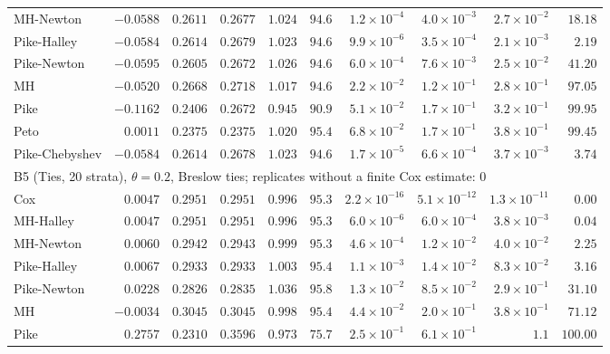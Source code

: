\begin{landscape}
\begin{longtable}{lrrrrrrrrr}
MH-Newton & $-0.0588$ & $0.2611$ & $0.2677$ & $1.024$ & $94.6$ & $1.2 \times 10^{-4}$ & $4.0 \times 10^{-3}$ & $2.7 \times 10^{-2}$ & $18.18$ \\
Pike-Halley & $-0.0584$ & $0.2614$ & $0.2679$ & $1.023$ & $94.6$ & $9.9 \times 10^{-6}$ & $3.5 \times 10^{-4}$ & $2.1 \times 10^{-3}$ & $2.19$ \\
Pike-Newton & $-0.0595$ & $0.2605$ & $0.2672$ & $1.026$ & $94.6$ & $6.0 \times 10^{-4}$ & $7.6 \times 10^{-3}$ & $2.5 \times 10^{-2}$ & $41.20$ \\
MH & $-0.0520$ & $0.2668$ & $0.2718$ & $1.017$ & $94.6$ & $2.2 \times 10^{-2}$ & $1.2 \times 10^{-1}$ & $2.8 \times 10^{-1}$ & $97.05$ \\
Pike & $-0.1162$ & $0.2406$ & $0.2672$ & $0.945$ & $90.9$ & $5.1 \times 10^{-2}$ & $1.7 \times 10^{-1}$ & $3.2 \times 10^{-1}$ & $99.95$ \\
Peto & $0.0011$ & $0.2375$ & $0.2375$ & $1.020$ & $95.4$ & $6.8 \times 10^{-2}$ & $1.7 \times 10^{-1}$ & $3.8 \times 10^{-1}$ & $99.45$ \\
Pike-Chebyshev & $-0.0584$ & $0.2614$ & $0.2678$ & $1.023$ & $94.6$ & $1.7 \times 10^{-5}$ & $6.6 \times 10^{-4}$ & $3.7 \times 10^{-3}$ & $3.74$ \\
\multicolumn{10}{l}{B5 (Ties, 20 strata), $\theta = 0.2$, Breslow ties; replicates without a finite Cox estimate: 0} \\
Cox & $0.0047$ & $0.2951$ & $0.2951$ & $0.996$ & $95.3$ & $2.2 \times 10^{-16}$ & $5.1 \times 10^{-12}$ & $1.3 \times 10^{-11}$ & $0.00$ \\
MH-Halley & $0.0047$ & $0.2951$ & $0.2951$ & $0.996$ & $95.3$ & $6.0 \times 10^{-6}$ & $6.0 \times 10^{-4}$ & $3.8 \times 10^{-3}$ & $0.04$ \\
MH-Newton & $0.0060$ & $0.2942$ & $0.2943$ & $0.999$ & $95.3$ & $4.6 \times 10^{-4}$ & $1.2 \times 10^{-2}$ & $4.0 \times 10^{-2}$ & $2.25$ \\
Pike-Halley & $0.0067$ & $0.2933$ & $0.2933$ & $1.003$ & $95.4$ & $1.1 \times 10^{-3}$ & $1.4 \times 10^{-2}$ & $8.3 \times 10^{-2}$ & $3.16$ \\
Pike-Newton & $0.0228$ & $0.2826$ & $0.2835$ & $1.036$ & $95.8$ & $1.3 \times 10^{-2}$ & $8.5 \times 10^{-2}$ & $2.9 \times 10^{-1}$ & $31.10$ \\
MH & $-0.0034$ & $0.3045$ & $0.3045$ & $0.998$ & $95.4$ & $4.4 \times 10^{-2}$ & $2.0 \times 10^{-1}$ & $3.8 \times 10^{-1}$ & $71.12$ \\
Pike & $0.2757$ & $0.2310$ & $0.3596$ & $0.973$ & $75.7$ & $2.5 \times 10^{-1}$ & $6.1 \times 10^{-1}$ & $1.1$ & $100.00$ \\

\end{longtable}
\end{landscape}
